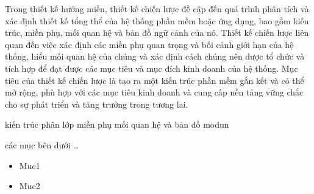 
Trong thiết kế hướng miền, thiết kế chiến lược đề cập đến quá trình phân tích và xác định thiết kế tổng thể của hệ thống phần mềm hoặc ứng dụng, bao gồm kiến trúc, miền phụ, mối quan hệ và bản đồ ngữ cảnh của nó. Thiết kế chiến lược liên quan đến việc xác định các miền phụ quan trọng và bối cảnh giới hạn của hệ thống, hiểu mối quan hệ của chúng và xác định cách chúng nên được tổ chức và tích hợp để đạt được các mục tiêu và mục đích kinh doanh của hệ thống. Mục tiêu của thiết kế chiến lược là tạo ra một kiến trúc phần mềm gắn kết và có thể mở rộng, phù hợp với các mục tiêu kinh doanh và cung cấp nền tảng vững chắc cho sự phát triển và tăng trưởng trong tương lai.

%
kiến trúc phân lớp
miền phụ
mối quan hệ và bản đồ
modun

các mục bên dưới \dots

\begin{itemize}
\item Muc1
\item Muc2
\end{itemize}

